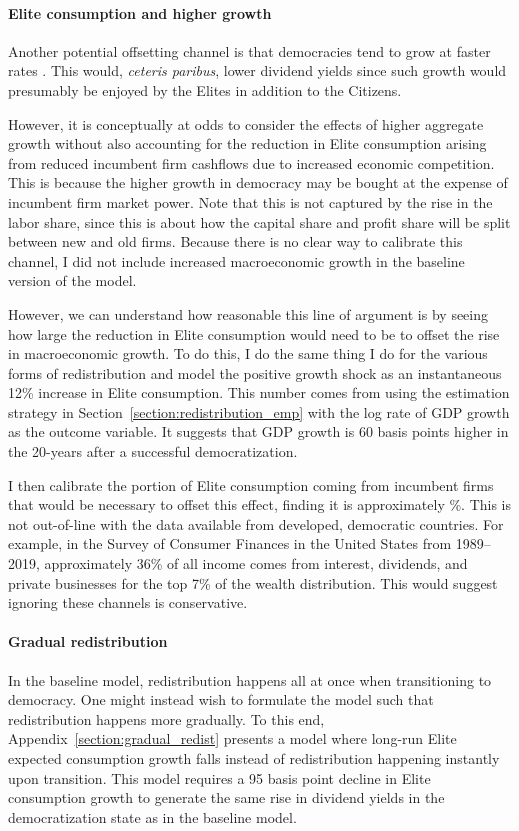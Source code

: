 \paragraph{Elite consumption and higher growth}
\label{par:higher_growth_beg}
Another potential offsetting channel is that democracies tend to grow at faster rates \citep{Acemoglu2019}. This would, {\it ceteris paribus}, lower dividend yields since such growth would presumably be enjoyed by the Elites in addition to the Citizens.

However, it is conceptually at odds to consider the effects of higher aggregate growth without also accounting for the reduction in Elite consumption arising from reduced incumbent firm cashflows due to increased economic competition. This is because the higher growth in democracy may be bought at the expense of incumbent firm market power. Note that this is not captured by the rise in the labor share, since this is about how the capital share and profit share will be split between new and old firms. Because there is no clear way to calibrate this channel, I did not include increased macroeconomic growth in the baseline version of the model.

However, we can understand how reasonable this line of argument is by seeing how large the reduction in Elite consumption would need to be to offset the rise in macroeconomic growth. To do this, I do the same thing I do for the various forms of redistribution and model the positive growth shock as an instantaneous 12\% increase in Elite consumption. This number comes from using the estimation strategy in Section~\ref{section:redistribution_emp} with the log rate of GDP growth as the outcome variable. It suggests that GDP growth is 60 basis points higher in the 20-years after a successful democratization.

I then calibrate the portion of Elite consumption coming from incumbent firms that would be necessary to offset this effect, finding it is approximately \modelHigherGrowthAdj\%. This is not out-of-line with the data available from developed, democratic countries. For example, in the Survey of Consumer Finances in the United States from 1989--2019, approximately 36\% of all income comes from interest, dividends, and private businesses for the top 7\% of the wealth distribution. This would suggest ignoring these channels is conservative.
\label{par:higher_growth_end}

\paragraph{Gradual redistribution}
\label{par:gradual_redist}
In the baseline model, redistribution happens all at once when transitioning to democracy. One might instead wish to formulate the model such that redistribution happens more gradually. To this end, Appendix~\ref{section:gradual_redist} presents a model where long-run Elite expected consumption growth falls instead of redistribution happening instantly upon transition. This model requires a 95 basis point decline in Elite consumption growth to generate the same rise in dividend yields in the democratization state as in the baseline model.

